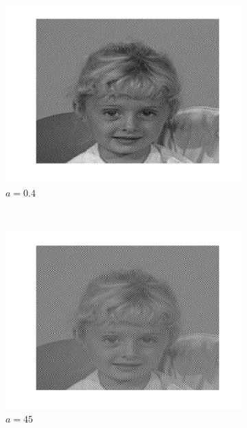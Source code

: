 \begin{figure}
  \centering
  \begin{subfigure}[b]{0.3\textwidth}
    \includegraphics[width=\textwidth]{Q2/unblurred_40.png}
    \caption{$a = 0.4$}
    \label{fig:a4}
  \end{subfigure}%
  ~ %
  \begin{subfigure}[b]{0.3\textwidth}
    \includegraphics[width=\textwidth]{Q2/unblurred_45.png}
    \caption{$a = 45$}
    \label{fig:a45}
  \end{subfigure}%
  ~
  \begin{subfigure}[b]{0.3\textwidth}

\end{subfigure}
\end{figure}
